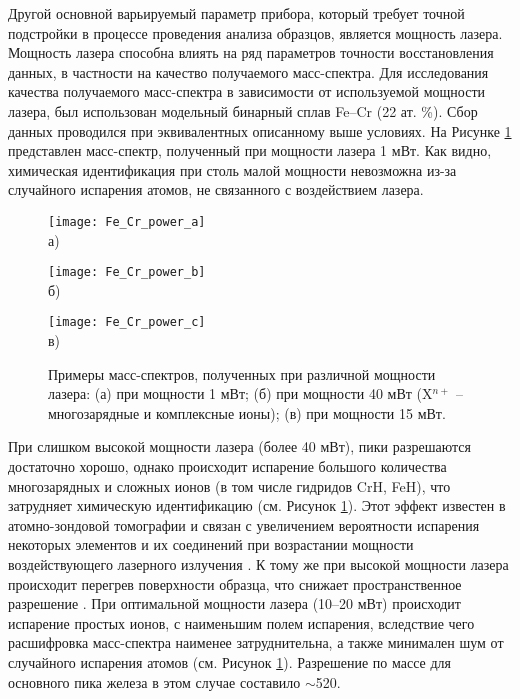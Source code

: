 Другой основной варьируемый параметр прибора, который требует точной подстройки в процессе проведения анализа образцов, является мощность лазера. Мощность лазера способна влиять на ряд параметров точности восстановления данных, в частности на качество получаемого масс-спектра. Для исследования качества получаемого масс-спектра в зависимости от используемой мощности лазера, был использован модельный бинарный сплав Fe–Cr (22 ат. \%). Сбор данных проводился при эквивалентных описанному выше условиях. На Рисунке \cref{fig:Fe_Cr_power} представлен масс-спектр, полученный при мощности лазера 1 мВт. Как видно, химическая идентификация при столь малой мощности невозможна из-за случайного испарения атомов, не связанного с воздействием лазера.

\begin{figure}[htb]
	\begin{minipage}[b]{0.49\textwidth}\centering
		\texttt{[image: Fe\_Cr\_power\_a]} \\ а)
	\end{minipage}
	\begin{minipage}[b]{0.49\textwidth}\centering
		\texttt{[image: Fe\_Cr\_power\_b]} \\ б)
	\end{minipage}
	\begin{minipage}[b]{0.49\textwidth}\centering
		\texttt{[image: Fe\_Cr\_power\_c]} \\ в)
	\end{minipage}
	\caption{Примеры масс-спектров, полученных при различной мощности лазера: (а) при мощности 1 мВт; (б) при мощности 40 мВт (X$^{n+}$ – многозарядные и комплексные ионы); (в) при мощности 15 мВт.}
	\label{fig:Fe_Cr_power}
\end{figure}

При слишком высокой мощности лазера (более 40 мВт), пики разрешаются достаточно хорошо, однако происходит испарение большого количества многозарядных и сложных ионов (в том числе гидридов CrH, FeH), что затрудняет химическую идентификацию (см. Рисунок \cref{fig:Fe_Cr_power}). Этот эффект известен в атомно-зондовой томографии и связан с увеличением вероятности испарения некоторых элементов и их соединений при возрастании мощности воздействующего лазерного излучения \cite{Tu15}. К тому же при высокой мощности лазера происходит перегрев поверхности образца, что снижает пространственное разрешение \cite{Cerezo07}. При оптимальной мощности лазера (10–20 мВт) происходит испарение простых ионов, с наименьшим полем испарения, вследствие чего расшифровка масс-спектра наименее затруднительна, а также минимален шум от случайного испарения атомов (см. Рисунок \cref{fig:Fe_Cr_power}). Разрешение по массе для основного пика железа в этом случае составило $\sim$520.


